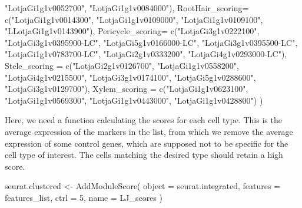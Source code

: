 \documentclass[
  letterpaper,
  DIV=11,
  numbers=noendperiod]{scrartcl}
\newenvironment{Shaded}{}{}
\newcommand{\AttributeTok}[1]{\textcolor[rgb]{0.49,0.56,0.16}{#1}}
\newcommand{\DecValTok}[1]{\textcolor[rgb]{0.25,0.63,0.44}{#1}}
\newcommand{\FunctionTok}[1]{\textcolor[rgb]{0.02,0.16,0.49}{#1}}
\newcommand{\NormalTok}[1]{#1}
\newcommand{\OtherTok}[1]{\textcolor[rgb]{0.00,0.44,0.13}{#1}}
\newcommand{\StringTok}[1]{\textcolor[rgb]{0.25,0.44,0.63}{#1}}
\begin{document}
\begin{Shaded}
\begin{Highlighting}[]
                           \StringTok{"LotjaGi1g1v0052700"}\NormalTok{,}
                           \StringTok{"LotjaGi1g1v0084000"}\NormalTok{),}
    \StringTok{\textquotesingle{}RootHair\_scoring\textquotesingle{}}\OtherTok{=} \FunctionTok{c}\NormalTok{(}\StringTok{"LotjaGi1g1v0014300"}\NormalTok{,}
                   \StringTok{"LotjaGi1g1v0109000"}\NormalTok{,}
                   \StringTok{"LotjaGi1g1v0109100"}\NormalTok{,}
                   \StringTok{"LLotjaGi1g1v0143900"}\NormalTok{),  }
    \StringTok{\textquotesingle{}Pericycle\_scoring\textquotesingle{}}\OtherTok{=} \FunctionTok{c}\NormalTok{(}\StringTok{"LotjaGi3g1v0222100"}\NormalTok{,}
                   \StringTok{"LotjaGi3g1v0395900{-}LC"}\NormalTok{,}
                   \StringTok{"LotjaGi5g1v0166000{-}LC"}\NormalTok{,}
                   \StringTok{"LotjaGi3g1v0395500{-}LC"}\NormalTok{,}
                   \StringTok{"LotjaGi1g1v0783700{-}LC"}\NormalTok{,}
                   \StringTok{"LotjaGi2g1v0333200"}\NormalTok{,}
                   \StringTok{"LotjaGi4g1v0293000{-}LC"}\NormalTok{),     }
    \StringTok{\textquotesingle{}Stele\_scoring\textquotesingle{}} \OtherTok{=} \FunctionTok{c}\NormalTok{(}\StringTok{"LotjaGi2g1v0126700"}\NormalTok{,}
                \StringTok{"LotjaGi1g1v0558200"}\NormalTok{,}
                \StringTok{"LotjaGi4g1v0215500"}\NormalTok{,}
                \StringTok{"LotjaGi3g1v0174100"}\NormalTok{,}
                \StringTok{"LotjaGi5g1v0288600"}\NormalTok{,}
                \StringTok{"LotjaGi3g1v0129700"}\NormalTok{),}
    \StringTok{\textquotesingle{}Xylem\_scoring\textquotesingle{}} \OtherTok{=} \FunctionTok{c}\NormalTok{(}\StringTok{"LotjaGi1g1v0623100"}\NormalTok{,}
                \StringTok{"LotjaGi1g1v0569300"}\NormalTok{,}
                \StringTok{"LotjaGi1g1v0443000"}\NormalTok{,}
                \StringTok{"LotjaGi1g1v0428800"}\NormalTok{)}
\NormalTok{    )}
\end{Highlighting}
\end{Shaded}

Here, we need a function calculating the scores for each cell type. This
is the average expression of the markers in the list, from which we
remove the average expression of some control genes, which are supposed
not to be specific for the cell type of interest. The cells matching the
desired type should retain a high score.

\begin{Shaded}
\begin{Highlighting}[]
\NormalTok{seurat.clustered }\OtherTok{\textless{}{-}} \FunctionTok{AddModuleScore}\NormalTok{(}
  \AttributeTok{object =}\NormalTok{ seurat.integrated,}
  \AttributeTok{features =}\NormalTok{ features\_list,}
  \AttributeTok{ctrl =} \DecValTok{5}\NormalTok{,}
  \AttributeTok{name =} \StringTok{\textquotesingle{}LJ\_scores\textquotesingle{}}
\NormalTok{)}
\end{Highlighting}
\end{Shaded}
\end{document}
